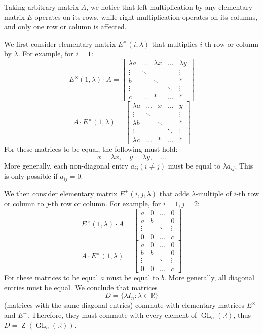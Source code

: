 \documentclass{article}
\theoremstyle{definition}
\newcommand{\R}{\mathbb{R}}
\newcommand{\GL}{\operatorname{GL}}
\newcommand{\GLnR}{\GL_n(\R)}
\begin{document}
Taking arbitrary matrix $A$, we notice that left-multiplication by any elementary matrix $E$ operates on its rows, while right-multiplication operates on its columns, and only one row or column is affected.

We first consider elementary matrix $E^{\times}(i, \lambda)$ that multiplies $i$-th row or column by $\lambda$. For example, for $i=1$:
\[ E^{\times}(1, \lambda) \cdot A =
    \begin{bmatrix}
        \lambda a & \dots & \lambda x & \dots & \lambda y \\
        \vdots & \ddots & & & \vdots \\
        b & & \ddots & & * \\
        \vdots & & & \ddots & \vdots \\
        c & \dots & * & \dots & * 
    \end{bmatrix}
\]
\[ A \cdot E^{\times}(1, \lambda) =
    \begin{bmatrix}
        \lambda a & \dots & x & \dots & y \\
        \vdots & \ddots & & & \vdots \\
        \lambda b & & \ddots & & * \\
        \vdots & & & \ddots & \vdots \\
        \lambda c & \dots & * & \dots & * 
    \end{bmatrix}
\]
For these matrices to be equal, the following must hold:
\[ x = \lambda x, \quad y = \lambda y, \quad \dots \]
More generally, each non-diagonal entry $a_{ij} (i \neq j)$ must be equal to $\lambda a_{ij}$.
This is only possible if $a_{ij} = 0$.

We then consider elementary matrix $E^{+}(i, j, \lambda)$ that adds $\lambda$-multiple of $i$-th row or column to $j$-th row or column.
For example, for $i=1, j=2$:
\[ E^{\times}(1, \lambda) \cdot A =
    \begin{bmatrix}
        a & 0 & \dots & 0 \\
        a & b & & 0 \\
        \vdots & & \ddots & \vdots \\
        0 & 0 & \dots & c
    \end{bmatrix}
\]
\[  A \cdot E^{\times}(1, \lambda) =
    \begin{bmatrix}
        a & 0 & \dots & 0 \\
        b & b & & 0 \\
        \vdots & & \ddots & \vdots \\
        0 & 0 & \dots & c
    \end{bmatrix}
\]
For these matrices to be equal $a$ must be equal to $b$.
More generally, all diagonal entries must be equal. 
We conclude that matrices
\[ D = \{ \lambda I_n : \lambda \in \R \} \]
(matrices with the same diagonal entries) commute with elementary matrices $E^{\times}$ and $E^{+}$. 
Therefore, they must commute with every element of $\GLnR$, thus $D = \operatorname{Z}(\GLnR)$.
\end{document}
